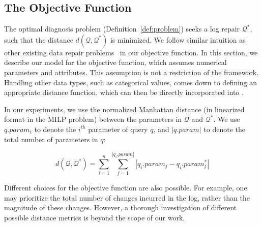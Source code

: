 
\subsection{The Objective Function}\label{sec:objfunction}

The optimal diagnosis problem (Definition~\ref{def:problem}) seeks a
log repair $\mathcal{Q}^*$, such that the distance
$d(\mathcal{Q},\mathcal{Q}^*)$ is minimized. We follow
similar intuition as other existing data repair problems~\cite{dallachiesa2013nadeef} in our objective function. In this section, we
describe our model for the objective function, which assumes numerical
parameters and attributes. This assumption is not a restriction of the
\sys framework.
Handling other data types, such as categorical values, comes down to defining an appropriate distance function, which can then be directly incorporated into \sys.

In our experiments, we use the normalized Manhattan
distance (in linearized format in the MILP problem) 
between the parameters in $\mathcal{Q}$ and
$\mathcal{Q}^*$. We use $q.param_i$ to denote the $i^{th}$ parameter
of query $q$, and $|q.param|$ to denote the total number of parameters
in $q$: 

\[d(\mathcal{Q}, \mathcal{Q}^*) = \sum_{i = 1} ^{n} \sum_{j =
1}^{|q_i.param|} |q_i.param_j - q_i.param_j^*|\]
\vspace*{-0.1in}

Different choices for the objective function are also possible. For
example, one may prioritize the total number of changes incurred in
the log, rather than the magnitude of these changes. However, a
thorough investigation of different possible distance metrics is
beyond the scope of our work.



